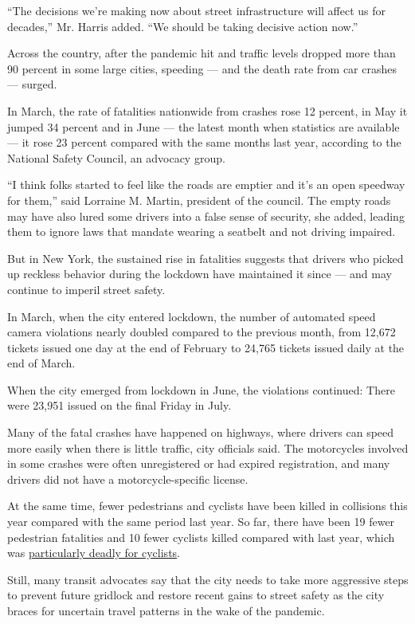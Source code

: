``The decisions we're making now about street infrastructure will affect
us for decades,'' Mr. Harris added. ``We should be taking decisive
action now.''

Across the country, after the pandemic hit and traffic levels dropped
more than 90 percent in some large cities, speeding --- and the death
rate from car crashes --- surged.

In March, the rate of fatalities nationwide from crashes rose 12
percent, in May it jumped 34 percent and in June --- the latest month
when statistics are available --- it rose 23 percent compared with the
same months last year, according to the National Safety Council, an
advocacy group.

``I think folks started to feel like the roads are emptier and it's an
open speedway for them,'' said Lorraine M. Martin, president of the
council. The empty roads may have also lured some drivers into a false
sense of security, she added, leading them to ignore laws that mandate
wearing a seatbelt and not driving impaired.

But in New York, the sustained rise in fatalities suggests that drivers
who picked up reckless behavior during the lockdown have maintained it
since --- and may continue to imperil street safety.

In March, when the city entered lockdown, the number of automated speed
camera violations nearly doubled compared to the previous month, from
12,672 tickets issued one day at the end of February to 24,765 tickets
issued daily at the end of March.

When the city emerged from lockdown in June, the violations continued:
There were 23,951 issued on the final Friday in July.

Many of the fatal crashes have happened on highways, where drivers can
speed more easily when there is little traffic, city officials said. The
motorcycles involved in some crashes were often unregistered or had
expired registration, and many drivers did not have a
motorcycle-specific license.

At the same time, fewer pedestrians and cyclists have been killed in
collisions this year compared with the same period last year. So far,
there have been 19 fewer pedestrian fatalities and 10 fewer cyclists
killed compared with last year, which was
\href{https://www.nytimes3xbfgragh.onion/2020/01/01/nyregion/nyc-biking-deaths.html}{particularly
deadly for cyclists}.

Still, many transit advocates say that the city needs to take more
aggressive steps to prevent future gridlock and restore recent gains to
street safety as the city braces for uncertain travel patterns in the
wake of the pandemic.

